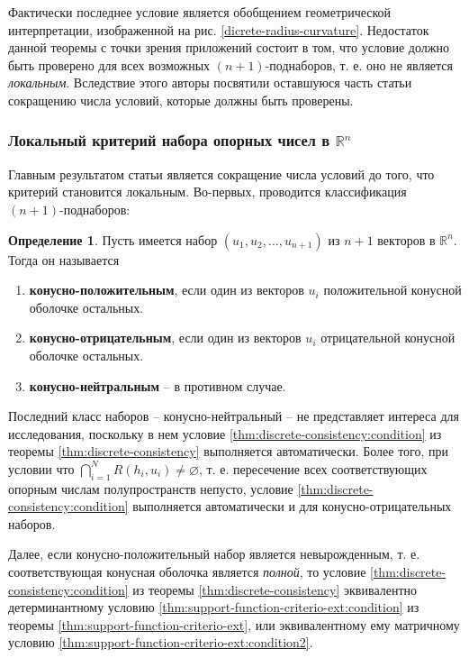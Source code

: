 \documentclass[a4paper, 12pt, titlepage]{article}
\theoremstyle{definition}
\newtheorem{SmartDefinition}{Определение}
\theoremstyle{plain}
\theoremstyle{plain}
\begin{document}
Фактически последнее условие является обобщением геометрической интерпретации,
изображенной на рис. \ref{dicrete-radius-curvature}. Недостаток данной теоремы
с точки зрения приложений состоит в том, что условие должно быть проверено для
всех возможных $(n + 1)$-поднаборов, т. е. оно не является \textit{локальным}.
Вследствие этого авторы посвятили оставшуюся часть статьи сокращению числа
условий, которые должны быть проверены.

\subsubsection{Локальный критерий набора опорных чисел в $\mathbb{R}^{n}$}
\label{sec:support-methods:3d-nonuniform:local-criterion}

Главным результатом статьи является сокращение числа условий до того, что
критерий становится локальным. Во-первых, проводится классификация $(n +
1)$-поднаборов:

\begin{SmartDefinition}
 \label{def:tuples-classifiction}
 Пусть имеется набор $(u_{1}, u_{2}, \ldots, u_{n + 1})$ из $n + 1$ векторов в
 $\mathbb{R}^{n}$. Тогда он называется
 \begin{enumerate}
  \item \textbf{конусно-положительным}, если один из векторов $u_{i}$
  положительной конусной оболочке остальных.
  \item \textbf{конусно-отрицательным}, если один из векторов $u_{i}$
  отрицательной конусной оболочке остальных.
  \item \textbf{конусно-нейтральным} -- в противном случае.
 \end{enumerate}
\end{SmartDefinition}

Последний класс наборов -- конусно-нейтральный -- не представляет интереса для
исследования, поскольку в нем условие \ref{thm:discrete-consistency:condition}
из теоремы \ref{thm:discrete-consistency} выполняется автоматически. Более
того, при условии что
$\bigcap \limits_{i = 1}^{N} R(h_{i}, u_{i}) \neq \varnothing$,
т. е. пересечение всех соответствующих опорным числам полупространств непусто,
условие \ref{thm:discrete-consistency:condition} выполняется автоматически и
для конусно-отрицательных наборов.

Далее, если конусно-положительный набор является невырожденным, т. е.
соответствующая конусная оболочка является \textit{полной}, то условие
\ref{thm:discrete-consistency:condition} из теоремы
\ref{thm:discrete-consistency} эквивалентно детерминантному условию
\ref{thm:support-function-criterio-ext:condition} из теоремы
\ref{thm:support-function-criterio-ext}, или эквивалентному ему матричному
условию \ref{thm:support-function-criterio-ext:condition2}.
\end{document}
